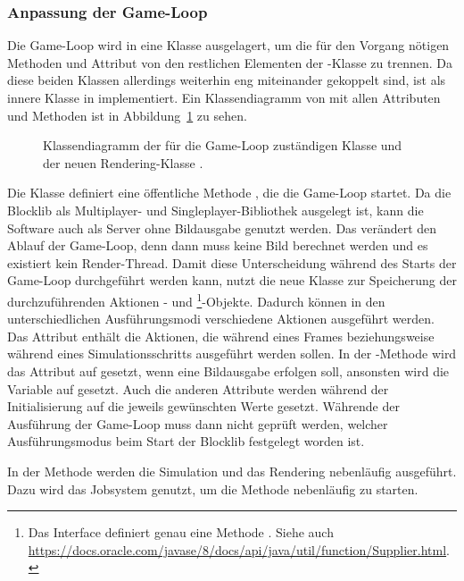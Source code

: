 \subsubsection{Anpassung der Game-Loop}\label{sec:adjustGameLoop}
Die Game-Loop wird in eine Klasse  ausgelagert, um die für den Vorgang nötigen Methoden und Attribut von den restlichen Elementen der -Klasse zu trennen. Da diese beiden Klassen allerdings weiterhin eng miteinander gekoppelt sind, ist  als innere Klasse in  implementiert. Ein Klassendiagramm von   mit allen Attributen und Methoden ist in Abbildung~\ref{fig:DiagGameLoop} zu sehen.
\begin{figure}[htbp]
	\centering
	
	\caption[Klassendiagramm von  und .]{Klassendiagramm der für die Game-Loop zuständigen Klasse  und der neuen Rendering-Klasse .}\label{fig:DiagGameLoop}
\end{figure}
Die Klasse definiert eine öffentliche Methode , die die Game-Loop startet. Da die Blocklib als Multiplayer- und Singleplayer-Bibliothek ausgelegt ist, kann die Software auch als Server ohne Bildausgabe genutzt werden. Das verändert den Ablauf der Game-Loop, denn dann muss keine Bild berechnet werden und es existiert kein Render-Thread. Damit diese Unterscheidung während des Starts der Game-Loop durchgeführt werden kann, nutzt die neue Klasse  zur Speicherung der durchzuführenden Aktionen - und \footnote{Das Interface  definiert genau eine Methode . Siehe auch \url{https://docs.oracle.com/javase/8/docs/api/java/util/function/Supplier.html}.}-Objekte. Dadurch können in den unterschiedlichen Ausführungsmodi verschiedene Aktionen ausgeführt werden. Das Attribut  enthält die Aktionen, die während eines Frames beziehungsweise während eines Simulationsschritts ausgeführt werden sollen. In der -Methode wird das Attribut auf  gesetzt, wenn eine Bildausgabe erfolgen soll, ansonsten wird die Variable auf  gesetzt. Auch die anderen Attribute werden während der Initialisierung auf die jeweils gewünschten Werte gesetzt. Währende der Ausführung der Game-Loop muss dann nicht geprüft werden, welcher Ausführungsmodus beim Start der Blocklib festgelegt worden ist.

In der Methode  werden die Simulation und das Rendering nebenläufig ausgeführt. Dazu wird das Jobsystem genutzt, um die Methode  nebenläufig zu starten. 

